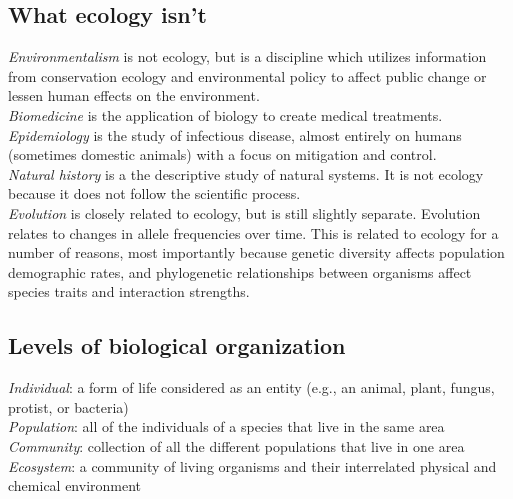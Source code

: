 \documentclass[12pt]{article}
\begin{document}
\subsection*{What ecology isn't}

\textit{Environmentalism} is not ecology, but is a discipline which utilizes information from conservation ecology and environmental policy to affect public change or lessen human effects on the environment. \\


\textit{Biomedicine} is the application of biology to create medical treatments. \\


\textit{Epidemiology} is the study of infectious disease, almost entirely on humans (sometimes domestic animals) with a focus on mitigation and control. \\


\textit{Natural history} is a the descriptive study of natural systems. It is not ecology because it does not follow the scientific process. \\


\textit{Evolution} is closely related to ecology, but is still slightly separate. Evolution relates to changes in allele frequencies over time. This is related to ecology for a number of reasons, most importantly because genetic diversity affects population demographic rates, and phylogenetic relationships between organisms affect species traits and interaction strengths. 










\subsection*{Levels of biological organization}


\textit{Individual}: a form of life considered as an entity (e.g., an animal, plant, fungus, protist, or bacteria) \\


\textit{Population}: all of the individuals of a species that live in the same area \\


\textit{Community}: collection of all the different populations that live in one area \\


\textit{Ecosystem}: a community of living organisms and their interrelated physical and chemical environment \\
\end{document}

